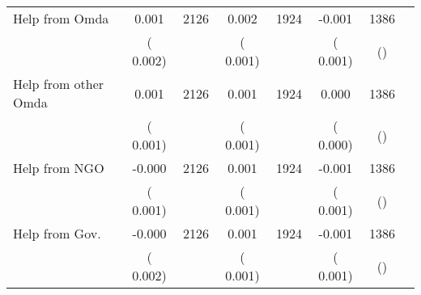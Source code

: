 \begin{tabular}{l*{6}{c}}
Help from Omda        &              0.001      &       2126       &              0.002      &       1924       &             -0.001      &       1386  &  &              \\
                       &       (       0.002)            &                               &       (       0.001)            &                               &       (       0.001)            &       () &                  \\
Help from other Omda        &              0.001      &       2126       &              0.001      &       1924       &              0.000      &       1386  &  &              \\
                       &       (       0.001)            &                               &       (       0.001)            &                               &       (       0.000)            &       () &                  \\
Help from NGO        &             -0.000      &       2126       &              0.001      &       1924       &             -0.001      &       1386  &  &              \\
                       &       (       0.001)            &                               &       (       0.001)            &                               &       (       0.001)            &       () &                  \\
Help from Gov.        &             -0.000      &       2126       &              0.001      &       1924       &             -0.001      &       1386  &  &              \\
                       &       (       0.002)            &                               &       (       0.001)            &                               &       (       0.001)            &       () &                  \\
\hline \end{tabular}